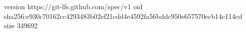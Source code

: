 version https://git-lfs.github.com/spec/v1
oid sha256:e930c70162cc4293483b02ef21cdd4e4592fa56bddc950e657570ecb14c114cd
size 349692
